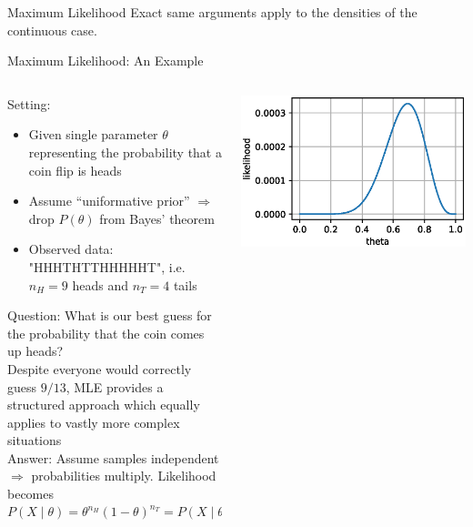 {\begin{frame}{Maximum Likelihood}
        Exact same arguments apply to the densities of the continuous case.
    \end{frame}

    \begin{frame}{Maximum Likelihood: An Example}
        \begin{columns}[onlytextwidth]
            \begin{column}{0.7\textwidth}
                Setting:
                \begin{itemize}
                    \item Given single parameter $\theta$ representing the probability that a coin flip is heads
                    \item Assume ``uniformative prior'' $\Rightarrow$ drop $P(\theta)$ from Bayes' theorem
                    \item Observed data: "HHHTHTTHHHHHT", i.e. $n_H = 9$ heads and $n_T = 4$ tails
                \end{itemize}
                \vspace*{3mm}

                Question: What is our best guess for the probability that the coin comes up heads?\\
                {\tiny Despite everyone would correctly guess $9/13$, MLE provides
                a structured approach which equally applies to vastly more complex situations}\\[3mm]

                Answer: Assume samples independent $\Rightarrow$ probabilities multiply. Likelihood becomes
                $$P(X \mid \theta) = \theta^{n_H}(1-\theta)^{n_T} = P(X \mid \theta) = \theta^9(1-\theta)^4$$
            \end{column}
            \begin{column}{0.3\textwidth}
                \begin{center}
                    \includegraphics[width=\textwidth]{fig/prob_mle.eps}
                \end{center}


\end{column}
\end{columns}
\end{frame}}
